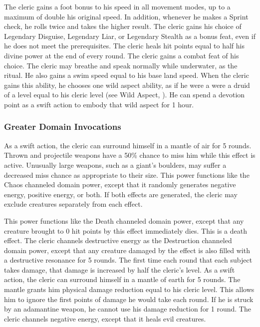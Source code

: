 The cleric gains a  foot bonus to his speed in all movement modes, up to a maximum of double his original speed.
In addition, whenever he makes a Sprint check, he rolls twice and takes the higher result.
The cleric gains his choice of Legendary Disguise, Legendary Liar, or Legendary Stealth as a bonus feat, even if he does not meet the prerequisites.
The cleric heals hit points equal to half his divine power at the end of every round.
The cleric gains a combat feat of his choice.
 The cleric may breathe and speak normally while underwater, as the 
ritual.
He also gains a swim speed equal to his base land speed.
When the cleric gains this ability, he chooses one wild aspect ability, as if he were a were a druid of a level equal to his cleric level (see Wild Aspect, ).
He can spend a devotion point as a swift action to embody that wild aspect for 1 hour.

\subsubsection{Greater Domain Invocations}\label{Greater Domain Invocations}

As a swift action, the cleric can surround himself in a mantle of air for 5 rounds.
Thrown and projectile weapons have a 50\% chance to miss him while this effect is active.
Unusually large weapons, such as a giant's boulders, may suffer a decreased miss chance as appropriate to their size.
This power functions like the Chaos channeled domain power, except that it randomly generates negative energy, positive energy, or both.
If both effects are generated, the cleric may exclude creatures separately from each effect.

This power functions like the Death channeled domain power, except that any creature brought to 0 hit points by this effect immediately dies.
This is a death effect.
The cleric channels destructive energy as the Destruction channeled domain power, except that any creature damaged by the effect is also filled with a destructive resonance for 5 rounds.
The first time each round that each subject takes damage, that damage is increased by half the cleric's level.
As a swift action, the cleric can surround himself in a mantle of earth for 5 rounds.
The mantle grants him physical damage reduction equal to his cleric level.
This allows him to ignore the first points of damage he would take each round.
If he is struck by an adamantine weapon, he cannot use his damage reduction for 1 round.
The cleric channels negative energy, except that it heals evil creatures.

